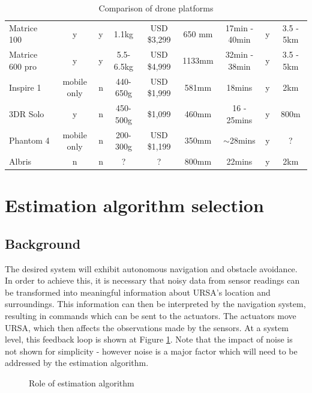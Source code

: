 \documentclass[capstone_report.tex]{subfiles}
\begin{document}
{\begin{table}
\begin{tabular}{@{}lcccccccc@{}}
Matrice 100            & y           & y   & 1.1kg              & USD \$3,299  & 650 mm & 17min - 40min & y           & 3.5 - 5km             \\
Matrice 600 pro        & y           & y   & 5.5-6.5kg          & USD \$4,999  & 1133mm & 32min - 38min & y           & 3.5 - 5km             \\
Inspire 1              & mobile only & n   & 440-650g           & USD \$1,999  & 581mm  & 18mins        & y           & 2km                   \\
3DR Solo               & y           & n   & 450-500g           & \$1,099      & 460mm  & 16 - 25mins   & y           & 800m                  \\
Phantom 4              & mobile only & n   & 200-300g           & USD \$1,199  & 350mm  & $\sim$28mins  & y           & ?                     \\
Albris                 & n           & n   & ?                  & ?            & 800mm  & 22mins        & y           & 2km                   \\ \bottomrule
\end{tabular}
\caption{Comparison of drone platforms}
\label{comparison}
\end{table}\clearpage}


\section{Estimation algorithm selection}
\subsection{Background}
The desired system will exhibit autonomous navigation and obstacle avoidance. In order to achieve this, it is necessary that noisy data from sensor readings can be transformed into meaningful information about URSA's location and surroundings. This information can then be interpreted by the navigation system, resulting in commands which can be sent to the actuators. The actuators move URSA, which then affects the observations made by the sensors. At a system level, this feedback loop is shown at Figure \ref{fig:estAlg1}. Note that the impact of noise is not shown for simplicity - however noise is a major factor which will need to be addressed by the estimation algorithm.

\begin{figure}[H]
\centering
	
	\caption{Role of estimation algorithm\label{fig:estAlg1}}
\end{figure}
\end{document}
